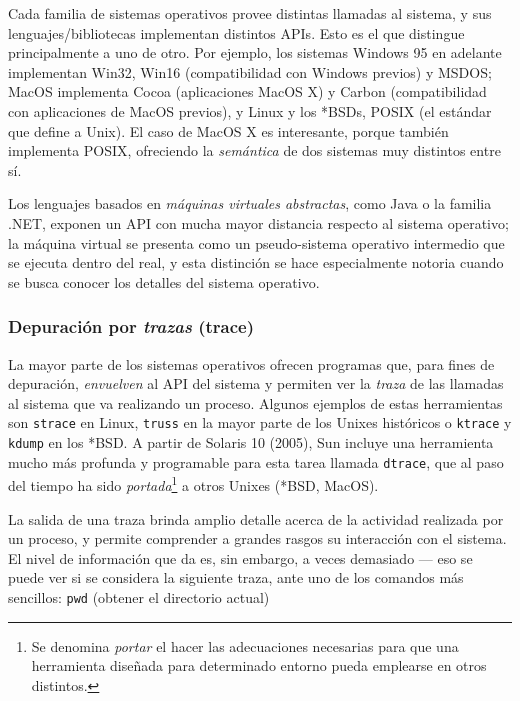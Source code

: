 \documentclass[11pt,fleqn]{book} %
\begin{document}
Cada familia de sistemas operativos provee distintas llamadas al sistema, y
sus lenguajes/bibliotecas implementan distintos APIs. Esto es el que
distingue principalmente a uno de otro. Por ejemplo, los sistemas
Windows 95 en adelante implementan Win32, Win16 (compatibilidad con
Windows previos) y MSDOS; MacOS implementa Cocoa (aplicaciones MacOS
X) y Carbon (compatibilidad con aplicaciones de MacOS previos), y
Linux y los *BSDs, POSIX (el estándar que define a Unix). El caso de
MacOS X es interesante, porque también implementa POSIX, ofreciendo la
\emph{semántica} de dos sistemas muy distintos entre sí.

Los lenguajes basados en \emph{máquinas virtuales abstractas}, como Java o
la familia .NET, exponen un API con mucha mayor distancia respecto al
sistema operativo; la máquina virtual se presenta como un
pseudo-sistema operativo intermedio que se ejecuta dentro del real, y
esta distinción se hace especialmente notoria cuando se busca conocer
los detalles del sistema operativo. 
\subsubsection{Depuración por \emph{trazas} (trace)}
\label{sec-2-7-1-1}


La mayor parte de los sistemas operativos ofrecen programas que, para
fines de depuración, \emph{envuelven} al API del sistema y permiten ver la
\emph{traza} de las llamadas al sistema que va realizando un
proceso. Algunos ejemplos de estas herramientas son \texttt{strace} en Linux,
\texttt{truss} en la mayor parte de los Unixes históricos o \texttt{ktrace} y
\texttt{kdump} en los *BSD. A partir de Solaris 10 (2005), Sun incluye una
herramienta mucho más profunda y programable para esta tarea llamada
\texttt{dtrace}, que al paso del tiempo ha sido \emph{portada}\footnote{Se denomina
\emph{portar} el hacer las adecuaciones necesarias para que una herramienta
diseñada para determinado entorno pueda emplearse en otros distintos. }
a otros Unixes (*BSD, MacOS).

La salida de una traza brinda amplio detalle acerca de la
actividad realizada por un proceso, y permite comprender a grandes
rasgos su interacción con el sistema. El nivel de información que da
es, sin embargo, a veces demasiado — eso se puede ver si se considera
la siguiente traza, ante uno de los comandos más sencillos: \texttt{pwd}
(obtener el directorio actual)
\end{document}
